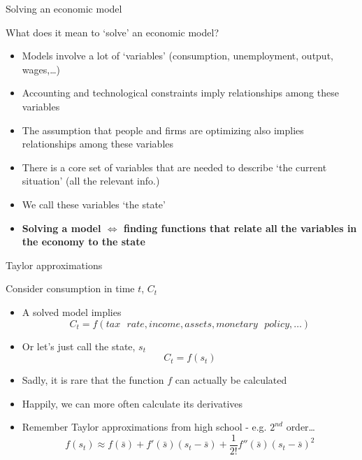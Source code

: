 

\begin{frame}{Solving an economic model}

What does it mean to `solve' an economic model?
\begin{itemize}
\item	Models involve a lot of `variables' (consumption, unemployment, output, wages,\ldots)
\item	Accounting and technological constraints imply relationships among these variables
\item	The assumption that people and firms are optimizing also implies relationships among these variables
\item	There is a core set of variables that are needed to describe `the current situation' (all the relevant info.)
\item	We call these variables `the state'
\item	\textbf{Solving a model $\Leftrightarrow$ finding functions that relate all the variables in the economy to the state}
\end{itemize}

\end{frame}



\begin{frame}{Taylor approximations}

Consider consumption in time $t$, $C_{t}$
\begin{itemize}
\item	A solved model implies
\[
C_{t} = f(tax\text{ }rate, income, assets, monetary\text{ }policy, \ldots)
\]
\item	Or let's just call the state, $s_{t}$
\[
C_{t} = f(s_{t})
\]
\item	Sadly, it is rare that the function $f$ can actually be calculated
\item	Happily, we can more often calculate its derivatives
\item	Remember Taylor approximations from high school - e.g. $2^{nd}$ order\ldots
\[
f(s_{t}) \approx f(\bar{s}) + f'(\bar{s})(s_{t}-\bar{s}) + \frac{1}{2!}f''(\bar{s})(s_{t}-\bar{s})^{2}
\]
\end{itemize}

\end{frame}

